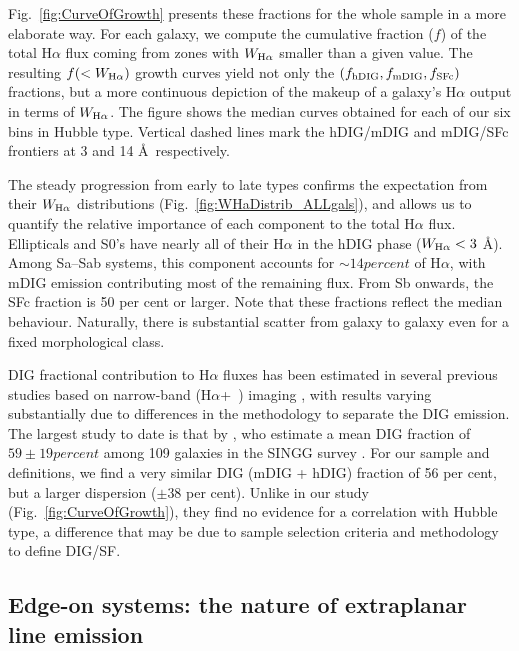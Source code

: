 \documentclass[a4paper, fleqn, usenatbib, useAMS]{mnras}
\newcommand{\Ha}{\ifmmode {\rm H}\alpha \else H$\alpha$\fi\xspace}
\newcommand{\nii}{\ifmmode [\rm{N}\,\textsc{ii}] \else [N\,{\sc ii}]\fi\xspace}
\begin{document}
Fig.\ \ref{fig:CurveOfGrowth} presents these fractions for the whole sample in a more elaborate way. For each galaxy, we compute the cumulative fraction ($f$) of the total \Ha flux coming from zones with $W_{\Ha}$ smaller than a given value. The resulting $f(<W_{\Ha})$ growth curves yield not only the $(f_{\rm hDIG} , f_{\rm mDIG} , f_{\rm SFc})$ fractions, but a more continuous depiction of the makeup of a galaxy's \Ha output in terms of $W_{\Ha}$. The figure shows the median curves obtained for each of our six bins in Hubble type. Vertical dashed lines mark the hDIG/mDIG and mDIG/SFc frontiers at 3 and 14 \AA\, respectively.

The steady progression from early to late types confirms the expectation from their $W_{\Ha}$ distributions  (Fig.\ \ref{fig:WHaDistrib_ALLgals}), and allows us to quantify the relative importance of each component to the total \Ha flux. Ellipticals and S0's have nearly all of their \Ha in the hDIG phase ($W_{\Ha} < 3$ \AA). Among Sa--Sab systems, this component accounts for $\sim 14 per cent$ of \Ha, with mDIG emission contributing most of the remaining flux. From Sb onwards, the SFc fraction is 50 per cent or larger. Note that these fractions reflect the median behaviour. Naturally, there is substantial scatter from galaxy to galaxy even for a fixed morphological class.

DIG fractional contribution to \Ha fluxes has been estimated in several previous studies based on narrow-band (\Ha+\ \nii) imaging \citep{Ferguson.etal.1996, Zurita.etal.2000, Thilker.etal.2002, Oey.etal.2007}, with results varying substantially due to differences in the methodology to separate the DIG emission. The largest study to date is that by \citet{Oey.etal.2007}, who estimate a mean DIG fraction of $59\pm19 per cent$ among 109 galaxies in the SINGG survey \citep{Meurer.etal.2006}. For our sample and definitions, we find a very similar DIG (mDIG + hDIG) fraction of 56 per cent, but a larger dispersion ($\pm 38$ per cent). Unlike in our study (Fig.\ \ref{fig:CurveOfGrowth}), they find no evidence for a correlation with Hubble type, a difference that may be due to sample selection criteria and methodology to define DIG/SF.

\subsection{Edge-on systems: the nature of extraplanar line emission}
\label{sec:EdgeOn}
\end{document}
